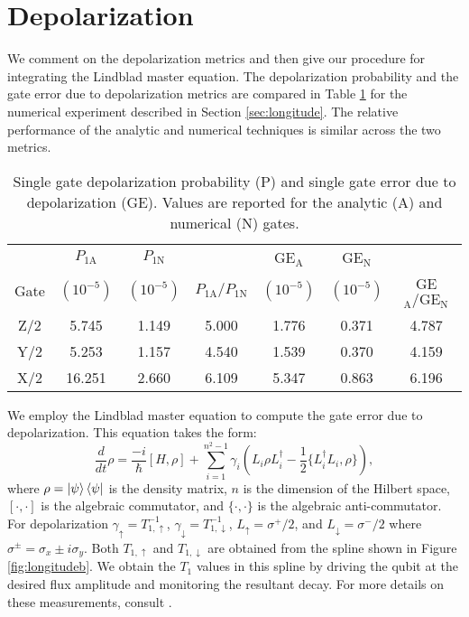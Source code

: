 \section{Depolarization \label{appendix:longitude}}
We comment on the depolarization metrics and then give
our procedure for integrating the Lindblad master equation.
The depolarization probability and the gate error due to
depolarization metrics are compared in Table \ref{tab:longitude} for the
numerical experiment described in Section \ref{sec:longitude}.
The relative performance of the analytic and numerical techniques
is similar across the two metrics.

\begin{table}[ht]
  \begin{tabular}{c | c | c | c | c | c | c}
         & $P_{1\textrm{A}}$ & $P_{1\textrm{N}}$ & & GE$_{\textrm{A}}$ & GE$_{\textrm{N}}$ &\\
    Gate & $(10^{-5})$ & $(10^{-5})$ & $P_{1\textrm{A}}/ P_{1\textrm{N}}$ & $(10^{-5})$ &
    $(10^{-5})$ & GE$_{\textrm{A}} / \textrm{GE}_{\textrm{N}}$\\
    \hline
    Z/2 & 5.745 & 1.149 & 5.000 & 1.776 & 0.371 & 4.787\\
    Y/2 & 5.253 & 1.157 & 4.540 & 1.539 & 0.370 & 4.159\\
    X/2 & 16.251 & 2.660 & 6.109 & 5.347 & 0.863 & 6.196\\
  \end{tabular}
  \caption{
    Single gate depolarization probability (P)
    and single gate error due to depolarization (GE).
    Values are reported for the analytic (A) and numerical (N) gates.
  }
  \label{tab:longitude}
\end{table}

We employ the Lindblad master equation
to compute the gate error due to depolarization.
This equation takes the form:
\begin{equation}
  \frac{d}{dt} \rho = \frac{-i}{\hbar} [H, \rho]
  + \sum_{i = 1}^{n^{2} - 1} \gamma_{i} (L_{i} \rho L_{i}^{\dagger}
  - \frac{1}{2} \{L_{i}^{\dagger} L_{i}, \rho\}),
\end{equation}
where $\rho = \ket{\psi}\bra{\psi}$ is the density matrix, $n$ is the
dimension of the Hilbert space,
$[\cdot, \cdot]$ is the algebraic commutator, and $\{\cdot, \cdot \}$ is the algebraic
anti-commutator.
For depolarization $\gamma_{\uparrow} = T_{1, \uparrow}^{-1}$,
$\gamma_{\downarrow} = T_{1, \downarrow}^{-1}$,
$L_{\uparrow} = \sigma^{+}/2$, and
$L_{\downarrow} = \sigma^{-}/2$ where $\sigma^{\pm} = \sigma_{x} \pm i \sigma_{y}$.
Both $T_{1, \uparrow}$ and $T_{1, \downarrow}$ are obtained from the spline
shown in Figure \ref{fig:longitudeb}.
We obtain the $T_{1}$ values in this spline
by driving the qubit at the desired flux amplitude
and monitoring the resultant decay. For more details
on these measurements, consult \cite{zhang2020universal}.

